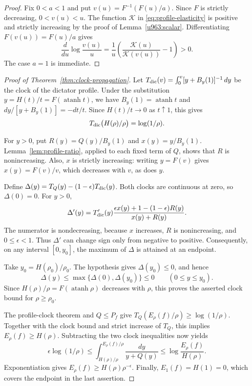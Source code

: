 \documentclass[11pt,letterpaper]{amsart}
\newcommand{\1}{\mathbf 1}
\DeclareMathOperator{\atanh}{atanh}
\numberwithin{equation}{section}
\begin{document}
\begin{proof}
Fix $0<a<1$ and put $v(u)=F^{-1}(F(u)/a)$.
Since $F$ is strictly decreasing, $0<v(u)<u$.
The function $\mathcal K$ in \eqref{eq:profile-elasticity}
is positive and strictly increasing by the proof of
Lemma~\ref{u963:scalar}.
Differentiating $F(v(u))=F(u)/a$ gives
\[
 \frac{d}{du}\log\frac{v(u)}u
 =\frac1u\left(\frac{\mathcal K(u)}{\mathcal K(v(u))}-1\right)>0.
\]
The case $a=1$ is immediate.
\end{proof}

\begin{proof}[Proof of Theorem~\ref{thm:clock-propagation}]
Let
$T_{\rm dic}(v)=\int_0^v [y+B_y(1)]^{-1}\,dy$
be the clock of the dictator profile.
Under the substitution $y=H(t)/t=F(\atanh t)$,
we have $B_y(1)=\atanh t$ and
$dy/[y+B_y(1)]=-dt/t$.
Since $H(t)/t\to0$ as $t\uparrow1$, this gives
\[
 T_{\rm dic}\bigl(H(\rho)/\rho\bigr)=\log(1/\rho).
\]

For $y>0$, put
$R(y)=Q(y)/B_y(1)$ and $x(y)=y/B_y(1)$.
Lemma~\ref{lem:profile-ratio}, applied to each fixed term of $Q$,
shows that $R$ is nonincreasing.
Also, $x$ is strictly increasing:
writing $y=F(v)$ gives $x(y)=F(v)/v$, which decreases with $v$,
as does $y$.

Define
$\Delta(y)=T_Q(y)-(1-\epsilon)T_{\rm dic}(y)$.
Both clocks are continuous at zero, so $\Delta(0)=0$.
For $y>0$,
\[
 \Delta'(y)
 =T'_{\rm dic}(y)
   \frac{\epsilon x(y)+1-(1-\epsilon)R(y)}
        {x(y)+R(y)}.
\]
The numerator is nondecreasing, because $x$ increases,
$R$ is nonincreasing, and $0\le\epsilon<1$.
Thus $\Delta'$ can change sign only from negative to positive.
Consequently, on any interval $[0,y_0]$, the maximum of
$\Delta$ is attained at an endpoint.

Take $y_0=H(\rho_0)/\rho_0$.
The hypothesis gives $\Delta(y_0)\le0$, and hence
\[
 \Delta(y)\le\max\{\Delta(0),\Delta(y_0)\}\le0
 \qquad(0\le y\le y_0).
\]
Since $H(\rho)/\rho=F(\atanh\rho)$ decreases with $\rho$,
this proves the asserted clock bound for $\rho\ge\rho_0$.

The profile-clock theorem and $Q\le P_f$ give
$T_Q(E_\rho(f)/\rho)\ge\log(1/\rho)$.
Together with the clock bound and strict increase of $T_Q$,
this implies $E_\rho(f)\ge H(\rho)$.
Subtracting the two clock inequalities now yields
\[
 \epsilon\log(1/\rho)
 \le
 \int_{H(\rho)/\rho}^{E_\rho(f)/\rho}
       \frac{dy}{y+Q(y)}
 \le
 \log\frac{E_\rho(f)}{H(\rho)}.
\]
Exponentiation gives
$E_\rho(f)\ge H(\rho)\rho^{-\epsilon}$.
Finally, $E_1(f)=H(1)=0$, which covers the endpoint
in the last assertion.
\end{proof}
\end{document}
